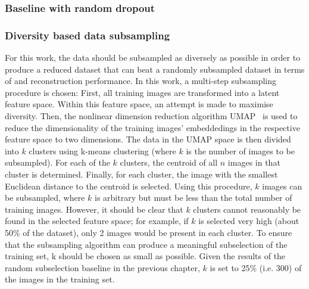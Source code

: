 \subsubsection{Baseline with random dropout}



\subsubsection{Diversity based data subsampling}

For this work, the data should be subsampled as diversely as possible in order to produce a reduced dataset that can beat a randomly subsampled dataset in terms of  and reconstruction performance. In this work, a multi-step subsampling procedure is chosen: First, all training images are transformed into a latent feature space. Within this feature space, an attempt is made to maximise diversity. Then, the nonlinear dimension reduction algorithm UMAP~\cite{mcinnesUMAPUniformManifold2018} is used to reduce the dimensionality of the training images' embeddedings in the respective feature space to two dimensions. The data in the UMAP space is then divided into $k$ clusters using k-means clustering (where $k$ is the number of images to be subsampled). For each of the $k$ clusters, the centroid of all $n$ images in that cluster is determined. Finally, for each cluster, the image with the smallest Euclidean distance to the centroid is selected. Using this procedure, $k$ images can be subsampled, where $k$ is arbitrary but must be less than the total number of training images. However, it should be clear that $k$ clusters cannot reasonably be found in the selected feature space; for example, if $k$ is selected very high (about 50\% of the dataset), only 2 images would be present in each cluster. To ensure that the subsampling algorithm can produce a meaningful subselection of the training set, k should be chosen as small as possible. Given the results of the random subselection baseline in the previous chapter, $k$ is set to 25\% (i.e. 300) of the images in the training set. 

